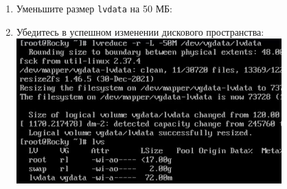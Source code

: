 \documentclass[12pt]{article}
\begin{document}
\begin{enumerate}
	\item Уменьшите размер \texttt{lvdata} на 50 МБ:
	\item Убедитесь в успешном изменении дискового пространства:
	      \\\includegraphics{13.png}
\end{enumerate}
\end{document}
